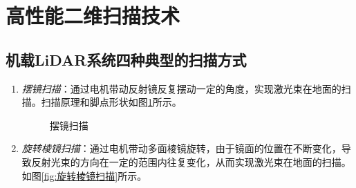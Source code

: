 \section{高性能二维扫描技术} %
\subsection{机载LiDAR系统四种典型的扫描方式} %
\begin{enumerate}
	\item \textit{摆镜扫描}：通过电机带动反射镜反复摆动一定的角度，实现激光束在地面的扫描。扫描原理和脚点形状如图\ref{fig:摆镜扫描}所示。
		\begin{figure}[htbp]
			\centering
			\quad
			\quad
			\caption{摆镜扫描}
			\label{fig:摆镜扫描}
		\end{figure}
	\item \textit{旋转棱镜扫描}：通过电机带动多面棱镜旋转，由于镜面的位置在不断变化，导致反射光束的方向在一定的范围内往复变化，从而实现激光束在地面的扫描。如图\ref{fig:旋转棱镜扫描}所示。
		\begin{figure}[htbp]
			\centering
			\quad

\end{figure}
\end{enumerate}
